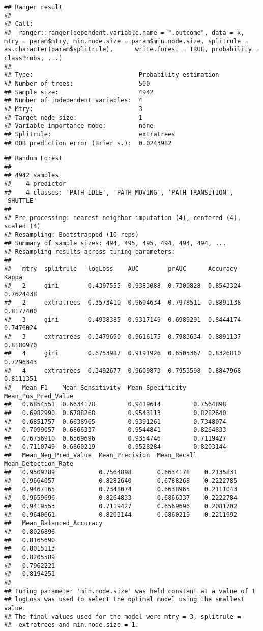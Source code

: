 \documentclass[]{article}
\begin{document}
\begin{verbatim}
## Ranger result
## 
## Call:
##  ranger::ranger(dependent.variable.name = ".outcome", data = x,      mtry = param$mtry, min.node.size = param$min.node.size, splitrule = as.character(param$splitrule),      write.forest = TRUE, probability = classProbs, ...) 
## 
## Type:                             Probability estimation 
## Number of trees:                  500 
## Sample size:                      4942 
## Number of independent variables:  4 
## Mtry:                             3 
## Target node size:                 1 
## Variable importance mode:         none 
## Splitrule:                        extratrees 
## OOB prediction error (Brier s.):  0.0243982
\end{verbatim}

\begin{verbatim}
## Random Forest 
## 
## 4942 samples
##    4 predictor
##    4 classes: 'PATH_IDLE', 'PATH_MOVING', 'PATH_TRANSITION', 'SHUTTLE' 
## 
## Pre-processing: nearest neighbor imputation (4), centered (4), scaled (4) 
## Resampling: Bootstrapped (10 reps) 
## Summary of sample sizes: 494, 495, 495, 494, 494, 494, ... 
## Resampling results across tuning parameters:
## 
##   mtry  splitrule   logLoss    AUC        prAUC      Accuracy   Kappa    
##   2     gini        0.4397555  0.9383088  0.7300828  0.8543324  0.7624438
##   2     extratrees  0.3573410  0.9604634  0.7978511  0.8891138  0.8177400
##   3     gini        0.4938385  0.9317149  0.6989291  0.8444174  0.7476024
##   3     extratrees  0.3479690  0.9616175  0.7983634  0.8891137  0.8180970
##   4     gini        0.6753987  0.9191926  0.6505367  0.8326810  0.7296343
##   4     extratrees  0.3492677  0.9609873  0.7953598  0.8847968  0.8111351
##   Mean_F1    Mean_Sensitivity  Mean_Specificity  Mean_Pos_Pred_Value
##   0.6854551  0.6634178         0.9419614         0.7564898          
##   0.6982990  0.6788268         0.9543113         0.8282640          
##   0.6851757  0.6638965         0.9391261         0.7348074          
##   0.7099057  0.6866337         0.9544841         0.8264833          
##   0.6756910  0.6569696         0.9354746         0.7119427          
##   0.7110749  0.6860219         0.9528284         0.8203144          
##   Mean_Neg_Pred_Value  Mean_Precision  Mean_Recall  Mean_Detection_Rate
##   0.9509289            0.7564898       0.6634178    0.2135831          
##   0.9664057            0.8282640       0.6788268    0.2222785          
##   0.9467165            0.7348074       0.6638965    0.2111043          
##   0.9659696            0.8264833       0.6866337    0.2222784          
##   0.9419553            0.7119427       0.6569696    0.2081702          
##   0.9640661            0.8203144       0.6860219    0.2211992          
##   Mean_Balanced_Accuracy
##   0.8026896             
##   0.8165690             
##   0.8015113             
##   0.8205589             
##   0.7962221             
##   0.8194251             
## 
## Tuning parameter 'min.node.size' was held constant at a value of 1
## logLoss was used to select the optimal model using the smallest value.
## The final values used for the model were mtry = 3, splitrule =
##  extratrees and min.node.size = 1.
\end{verbatim}
\end{document}
